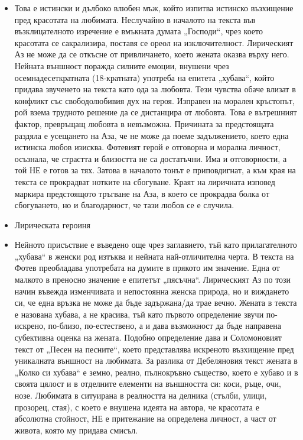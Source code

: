 \documentclass[12pt,a4paper]{article}
\begin{document}
\begin{itemize}
\vspace{-0.65cm}
\item Това е истински и дълбоко влюбен мъж, който изпитва истинско възхищение пред красотата на любимата. Неслучайно в началото на текста във възклицателното изречение е вмъкната думата „Господи“, чрез което красотата се сакрализира, поставя се ореол на изключителност. Лирическият Аз не може да се откъсне от привличането, което жената оказва върху него. Нейната външност поражда силните емоции, внушени чрез осемнадесеткратната (18-кратната) употреба на епитета „хубава“, който придава звученето на текста като ода за любовта. Тези чувства обаче влизат в конфликт със свободолюбивия дух на героя. Изправен на морален кръстопът, рой взема трудното решение да се дистанцира от любовта. Това е вътрешният фактор, превръщащ любовта в невъзможна. Причината за предстоящата раздяла е усещането на Аза, че не може да поеме задължението, което една истинска любов изисква. Фотевият герой е отговорна и морална личност, осъзнала, че страстта и близостта не са достатъчни. Има и отговорности, а той НЕ е готов за тях. Затова в началото тонът е приповдигнат, а към края на текста се прокрадват нотките на сбогуване. Краят на лиричната изповед маркира предстоящото тръгване на Аза, в което се прокрадва болка от сбогуването, но и благодарност, че тази любов се е случила.
\end{itemize}

\begin{itemize}[leftmargin=*]
\vspace{-0.65cm}
\item Лирическата героиня
\end{itemize}

\begin{itemize}
\vspace{-0.75cm}
\item Нейното присъствие е въведено още чрез заглавието, тъй като прилагателното „хубава“ в женски род изтъква и нейната най-отличителна черта. В текста на Фотев преобладава употребата на думите в прякото им значение. Една от малкото в преносно значение е епитетът „пясъчна“. Лирическият Аз по този начин въвежда изменчивата и непостоянна женска природа, но и виждането си, че една връзка не може да бъде задържана/да трае вечно. Жената в текста е назована хубава, а не красива, тъй като първото определение звучи по-искрено, по-близо, по-естествено, а и дава възможност да бъде направена субективна оценка на жената. Подобно определение дава и Соломоновият текст от „Песен на песните“, което представлява искреното възхищение пред уникалната външност на любимата. За разлика от Дебеляновия текст жената в „Колко си хубава“ е земно, реално, пълнокръвно същество, което е хубаво и в своята цялост и в отделните елементи на външността си: коси, ръце, очи, нозе. Любимата в ситуирана в реалността на делника (стълби, улици, прозорец, стая), с което е внушена идеята на автора, че красотата е абсолютна стойност, НЕ е притежание на определена личност, а част от живота, която му придава смисъл.
\end{itemize}
\end{document}
